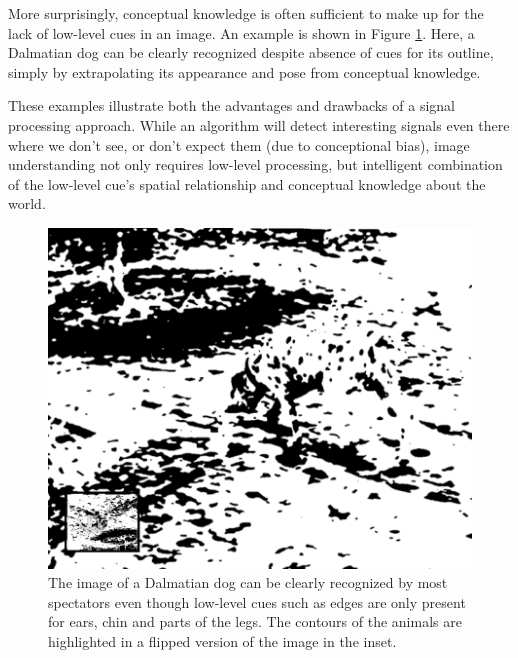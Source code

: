 More surprisingly, conceptual knowledge is often sufficient to make up for the lack of low-level cues in an image. An example is shown in Figure \ref{fig:dalmatian}. Here, a Dalmatian dog can be clearly recognized despite absence of cues for its outline, simply by extrapolating its appearance and pose from conceptual knowledge. 

These examples illustrate both the advantages and drawbacks of a signal processing approach. While an algorithm will detect interesting signals even there where we don't see, or don't expect them (due to conceptional bias), image understanding not only requires low-level processing, but intelligent combination of the low-level cue's spatial relationship and conceptual knowledge about the world. 


\begin{figure}
	\centering
		\includegraphics[width=\textwidth]{figs/dalmatian}
	\caption{The image of a Dalmatian dog can be clearly recognized by most spectators even though low-level cues such as edges are only present for ears, chin and parts of the legs. The contours of the animals are highlighted in a flipped version of the image in the inset.
	\label{fig:dalmatian}}
\end{figure}

